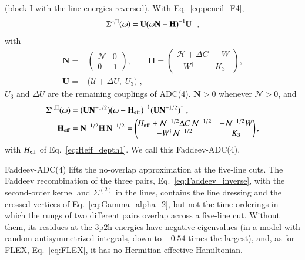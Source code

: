 \documentclass[aip,jcp,reprint,noshowkeys,superscriptaddress]{revtex4-1}
\newcommand{\bI}{\boldsymbol{1}}
\newcommand{\ppphh}{\text{3p2h}}
\begin{document}
(block I with the line energies reversed). With Eq.~\eqref{eq:pencil_F4},
\begin{equation}
\Sigma^{c,{\rm II}}(\omega)
=
\mathbf U\big(\omega\mathbf N-\mathbf H\big)^{-1}\mathbf U^\dagger \;,
\label{eq:Sigma_F4}
\end{equation}
with
\begin{equation}
\begin{aligned}
\mathbf N
={}&
\begin{pmatrix}\mathcal N&0\\0&\bI\end{pmatrix} ,
\qquad
\mathbf H
=
\begin{pmatrix}\mathcal H+\Delta C&-W\\-W^\dagger&K_3\end{pmatrix} ,
\\
\mathbf U
={}&
\big(\mathcal U+\Delta U,\;U_3\big) \;,
\end{aligned}
\label{eq:HNU_F4}
\end{equation}
$U_3$ and $\Delta U$ are the remaining couplings of ADC(4).\cite{Schirmer1983}
$\mathbf N>0$ whenever $\mathcal N>0$, and
\begin{equation}
\begin{aligned}
\Sigma^{c,{\rm II}}(\omega)
={}&
\big(\mathbf U\mathbf N^{-1/2}\big)\big(\omega-\mathbf H_{\rm eff}\big)^{-1}
\big(\mathbf U\mathbf N^{-1/2}\big)^\dagger \;,
\\
\mathbf H_{\rm eff}
={}&
\mathbf N^{-1/2}\mathbf H\,\mathbf N^{-1/2}
=
\begin{pmatrix}
H_{\rm eff}+\mathcal N^{-1/2}\Delta C\,\mathcal N^{-1/2} & -\mathcal N^{-1/2}W\\
-W^\dagger\mathcal N^{-1/2} & K_3
\end{pmatrix} ,
\end{aligned}
\label{eq:Heff_F4}
\end{equation}
with $H_{\rm eff}$ of Eq.~\eqref{eq:Heff_depth1}. We call this
Faddeev-ADC(4).

Faddeev-ADC(4) lifts the no-overlap approximation at the five-line cuts.
The Faddeev recombination of the three pairs, Eq.~\eqref{eq:Faddeev_inverse},
with the second-order kernel and $\Sigma^{(2)}$ in the lines, contains the
line dressing and the crossed vertices of Eq.~\eqref{eq:Gamma_alpha_2}, but
not the time orderings in which the rungs of two different pairs overlap
across a five-line cut. Without them, its residues at the $\ppphh$ energies
have negative eigenvalues (in a model with random antisymmetrized
integrals, down to $-0.54$ times the largest), and, as for FLEX,
Eq.~\eqref{eq:FLEX}, it has no Hermitian effective Hamiltonian.
\end{document}
